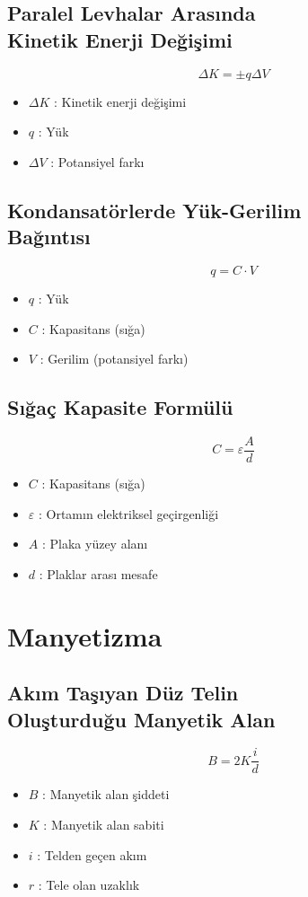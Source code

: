 \documentclass[a4paper, 11pt, titlepage]{article}
\begin{document}
\subsection[P.L.A. Kinetik Enerji Değişimi]{Paralel Levhalar Arasında \\Kinetik Enerji Değişimi}
\[
\Delta K = \pm q \Delta V
\]
\begin{itemize}
  \item $\Delta K$ : Kinetik enerji değişimi
  \item $q$ : Yük
  \item $\Delta V$ : Potansiyel farkı
\end{itemize}

\subsection[Yük-Gerilim Bağıntısı]{Kondansatörlerde Yük-Gerilim \\Bağıntısı}
\[
q = C \cdot V
\]
\begin{itemize}
  \item $q$ : Yük
  \item $C$ : Kapasitans (sığa)
  \item $V$ : Gerilim (potansiyel farkı)
\end{itemize}

\subsection{Sığaç Kapasite Formülü}
\[
C = \varepsilon \frac{A}{d}
\]
\begin{itemize}
  \item $C$ : Kapasitans (sığa)
  \item $\varepsilon$ : Ortamın elektriksel geçirgenliği
  \item $A$ : Plaka yüzey alanı
  \item $d$ : Plaklar arası mesafe
\end{itemize}


\section{Manyetizma}

\subsection[Akım Taşıyan Düz Telde Manyetik Alan]{Akım Taşıyan Düz Telin \\Oluşturduğu Manyetik Alan}
\[
B = 2K\frac{i}{d}
\]
\begin{itemize}
  \item $B$ : Manyetik alan şiddeti
  \item $K$ : Manyetik alan sabiti
  \item $i$ : Telden geçen akım
  \item $r$ : Tele olan uzaklık
\end{itemize}
\end{document}
